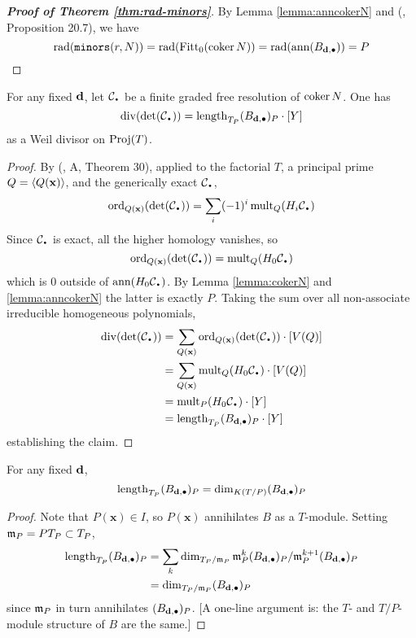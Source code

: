 \documentclass[fleqn,reqno]{amsart}
\numberwithin{first}{chapter}
\begin{document}
\begin{proof}[\bf Proof of Theorem \ref{thm:rad-minors}]
By Lemma \ref{lemma:anncokerN} and (\citet{Eis-book-95}, Proposition 20.7), we have
\[
\operatorname{rad}(\mathop{\tt minors}(r,N))=\operatorname{rad}(\operatorname{Fitt}_0(\operatorname{coker} N))=\operatorname{rad}(\operatorname{ann} (B_{\mathbf d,\bullet}))=P\qedhere
\]
\end{proof}

\begin{lemma}
\label{lemma:divdetC}
For any fixed $\mathbf d$, let $\mathcal{C}_\nbul$ be a finite graded free resolution of $\operatorname{coker} N$. One has
\[
	\thediv(\det(\mathcal{C}_\nbul))=\length_{T_P}(B_{\d,\bullet})_P\cdot[Y]
\]
as a Weil divisor on $\operatorname{Proj}(T)$.
\end{lemma}

\begin{proof}
By (\citet{GKZ-book-94}, A, Theorem 30), applied to the factorial $T$, a principal prime $Q=\langle Q(\mathbf x)\rangle$,
and the generically exact $\mathcal{C}_\nbul$,
\[
\ord_{Q(\mathbf x)}(\det(\mathcal{C}_\nbul))=\sum_i (-1)^i \mult_Q(H_i\mathcal{C}_\nbul)
\]
Since $\mathcal{C}_\nbul$ is exact, all the higher homology vanishes, so
\[
\ord_{Q(\mathbf x)}(\det(\mathcal{C}_\nbul))=\mult_Q(H_0\mathcal{C}_\nbul)
\]
which is $0$ outside of $\ann(H_0\mathcal{C}_\nbul)$.
By Lemma \ref{lemma:cokerN} and \ref{lemma:anncokerN} the latter is exactly $P$.
Taking the sum over all non-associate irreducible homogeneous polynomials,
\begin{align*}
\thediv(\det(\mathcal{C}_\nbul))&=\sum_{Q(\mathbf x)} \ord_{Q(\mathbf x)}(\det(\mathcal{C}_\nbul))\cdot[V(Q)]\\
&=\sum_{Q(\mathbf x)} \mult_Q (H_0\mathcal{C}_\nbul)\cdot [V(Q)]\\
&=\mult_P (H_0\mathcal{C}_\nbul)\cdot[Y]\\
&=\length_{T_P}(B_{\d,\bullet})_P\cdot[Y]
\end{align*}
establishing the claim.
\end{proof}

\begin{lemma}
\label{lemma:lengthBdimB}
For any fixed $\mathbf d$,
\[
\operatorname{length}_{T_P}(B_{\mathbf d,\bullet})_P=\dim_{K(T/P)}(B_{\mathbf d,\bullet})_P
\]
\end{lemma}

\begin{proof}
Note that $P(\mathbf x)\in I$, so $P(\mathbf x)$ annihilates $B$ as a $T$-module.
Setting $\mathfrak{m}_P=PT_P\subset T_P$,
\begin{align*}
\operatorname{length}_{T_P}(B_{\mathbf d,\bullet})_P&=
\sum_{k}\dim_{T_P/\mathfrak{m}_P} \mathfrak{m}_P^{k}(B_{\mathbf d,\bullet})_P/\mathfrak{m}_P^{k+1}(B_{\mathbf d,\bullet})_P\\
&=\dim_{T_P/\mathfrak{m}_P}(B_{\mathbf d,\bullet})_P
\end{align*}
since $\mathfrak{m}_P$ in turn annihilates $(B_{\mathbf d,\bullet})_P$.
[A one-line argument is: the $T$- and $T/P$-module structure of $B$ are the same.]
\end{proof}
\end{document}

